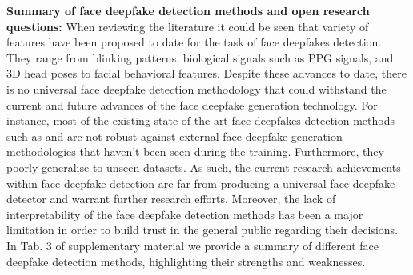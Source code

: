 \noindent\textbf{Summary of face deepfake detection methods and open research questions:} When reviewing the literature it could be seen that variety of features have been proposed to date for the task of face deepfakes detection. They range from blinking patterns, biological signals such as PPG signals, and 3D head poses to facial behavioral features. Despite these advances to date, there is no universal face deepfake detection methodology that could withstand the current and future advances of the face deepfake generation technology. For instance, most of the existing state-of-the-art face deepfakes detection methods such as \cite{mittal2020emotions} and \cite{zhou2021joint} are not robust against external face deepfake generation methodologies that haven't been seen during the training. Furthermore, they poorly generalise to unseen datasets. As such, the current research achievements within face deepfake detection are far from producing a universal face deepfake detector and warrant further research efforts. Moreover, the lack of interpretability of the face deepfake detection methods has been a major limitation in order to build trust in the general public regarding their decisions. In Tab. 3 of supplementary material we provide a summary of different face deepfake detection methods, highlighting their strengths and weaknesses.



